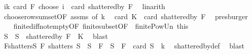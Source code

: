 \begin{isabellebody}
\ {\isachardoublequoteopen}{\isacharparenleft}{\kern0pt}{\isasymSum}i{\isasymle}k{\isachardot}{\kern0pt}\ card\ {\isacharparenleft}{\kern0pt}{\isasymUnion}F{\isacharparenright}{\kern0pt}\ choose\ i{\isacharparenright}{\kern0pt}\ {\isacharless}{\kern0pt}\ card\ {\isacharparenleft}{\kern0pt}shattered{\isacharunderscore}{\kern0pt}by\ F{\isacharparenright}{\kern0pt}{\isachardoublequoteclose}\ \isamarkupfalse%
\ linarith\isanewline
\ \ \isamarkupfalse%
\ choose{\isacharunderscore}{\kern0pt}row{\isacharunderscore}{\kern0pt}sum{\isacharunderscore}{\kern0pt}set{\isacharbrackleft}{\kern0pt}OF\ assms{\isacharparenleft}{\kern0pt}{}{\isacharparenright}{\kern0pt}{\isacharcomma}{\kern0pt}\ of\ k{\isacharbrackright}{\kern0pt}\ \isamarkupfalse%
\ {\isachardoublequoteopen}card\ {\isacharquery}{\kern0pt}K\ {\isacharless}{\kern0pt}\ card\ {\isacharparenleft}{\kern0pt}shattered{\isacharunderscore}{\kern0pt}by\ F{\isacharparenright}{\kern0pt}{\isachardoublequoteclose}\ \isamarkupfalse%
\ presburger\isanewline
\isanewline
\ \ \isamarkupfalse%
\ finite{\isacharunderscore}{\kern0pt}diff{\isacharunderscore}{\kern0pt}not{\isacharunderscore}{\kern0pt}empty{\isacharbrackleft}{\kern0pt}OF\ finite{\isacharunderscore}{\kern0pt}subset{\isacharbrackleft}{\kern0pt}OF\ {\isacharunderscore}{\kern0pt}\ finite{\isacharunderscore}{\kern0pt}Pow{\isacharunderscore}{\kern0pt}Un{\isacharbrackright}{\kern0pt}\ this{\isacharbrackright}{\kern0pt}\ \isanewline
\ \ \isamarkupfalse%
\ S\ \ {\isachardoublequoteopen}S\ {\isasymin}\ shattered{\isacharunderscore}{\kern0pt}by\ F\ {\isacharminus}{\kern0pt}\ {\isacharquery}{\kern0pt}K{\isachardoublequoteclose}\ \isamarkupfalse%
\ blast\isanewline
\ \ \isamarkupfalse%
\ \isamarkupfalse%
\ F{\isacharunderscore}{\kern0pt}shatters{\isacharunderscore}{\kern0pt}S{\isacharcolon}{\kern0pt}\ {\isachardoublequoteopen}F\ shatters\ S{\isachardoublequoteclose}\ \ {\isachardoublequoteopen}S\ {\isasymsubseteq}\ {\isasymUnion}F{\isachardoublequoteclose}\ \ {\isachardoublequoteopen}{\isasymnot}{\isacharparenleft}{\kern0pt}S\ {\isasymsubseteq}\ {\isasymUnion}F\ {\isasymand}\ card\ S\ {\isasymle}\ k{\isacharparenright}{\kern0pt}{\isachardoublequoteclose}\ \isamarkupfalse%
\ shattered{\isacharunderscore}{\kern0pt}by{\isacharunderscore}{\kern0pt}def\ \isamarkupfalse%
\ blast{\isacharplus}{\kern0pt}\isanewline
\ \ \isamarkupfalse%

\end{isabellebody}
